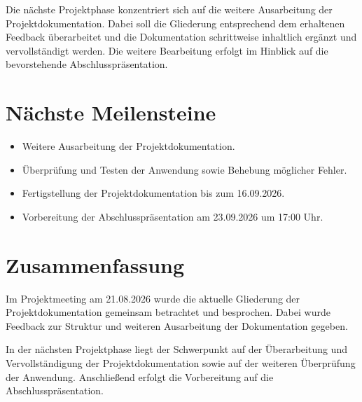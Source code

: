 \documentclass[a4paper,11pt]{article}
\begin{document}
Die nächste Projektphase konzentriert sich auf die weitere Ausarbeitung
der Projektdokumentation. Dabei soll die Gliederung entsprechend dem
erhaltenen Feedback überarbeitet und die Dokumentation schrittweise
inhaltlich ergänzt und vervollständigt werden. Die weitere Bearbeitung
erfolgt im Hinblick auf die bevorstehende Abschlusspräsentation.

\vspace{0.5cm}

\section{Nächste Meilensteine}

\begin{itemize}[leftmargin=1.2cm]

\item Weitere Ausarbeitung der Projektdokumentation.

\item Überprüfung und Testen der Anwendung sowie Behebung möglicher Fehler.

\item Fertigstellung der Projektdokumentation bis zum 16.09.2026.

\item Vorbereitung der Abschlusspräsentation am 23.09.2026 um 17:00 Uhr.

\end{itemize}

\vspace{1cm}

\section{Zusammenfassung}

Im Projektmeeting am 21.08.2026 wurde die aktuelle Gliederung der
Projektdokumentation gemeinsam betrachtet und besprochen. Dabei wurde
Feedback zur Struktur und weiteren Ausarbeitung der Dokumentation gegeben.

In der nächsten Projektphase liegt der Schwerpunkt auf der Überarbeitung
und Vervollständigung der Projektdokumentation sowie auf der weiteren
Überprüfung der Anwendung. Anschließend erfolgt die Vorbereitung auf die
Abschlusspräsentation.
\end{document}
